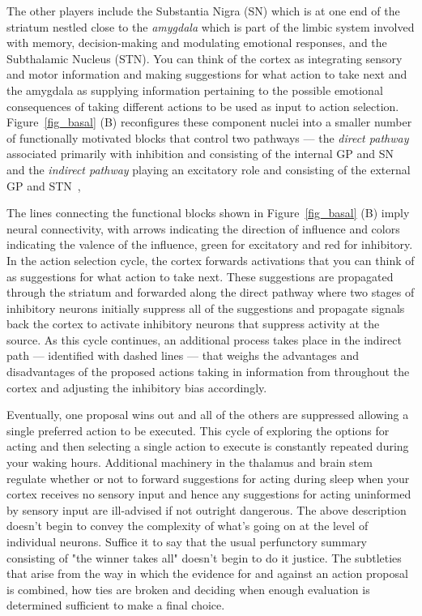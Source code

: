 \documentclass[letterpaper,11pt]{article}
\def\colorred#1{{\color{red}#1}}
\def\urlh#1{{}}
\def\emdash{---}
\begin{document}
The other players include the Substantia Nigra (SN) which is at one end of the striatum nestled close to the {\it{amygdala}} which is part of the limbic system involved with memory, decision-making and modulating emotional responses, and the Subthalamic Nucleus (STN). You can think of the cortex as integrating sensory and motor information and making suggestions for what action to take next and the amygdala as supplying information pertaining to the possible emotional consequences of taking different actions to be used as input to action selection. Figure~{\urlh{#fig_Basal_Ganglia_Anatomy_and_Physiology}{\ref{fig_basal}}} ({\colorred{B}}) reconfigures these component nuclei into a smaller number of functionally motivated blocks that control two pathways \emdash{} the {\it{direct pathway}} associated primarily with inhibition and consisting of the internal GP and SN and the {\it{indirect pathway}} playing an excitatory role and consisting of the external GP and STN~\cite{OReillyetalCCN-12,WangetalNATURE-NEUROSCIENCE-18},

The lines connecting the functional blocks shown in Figure~{\urlh{#fig_Basal_Ganglia_Anatomy_and_Physiology}{\ref{fig_basal}}} ({\colorred{B}}) imply neural connectivity, with arrows indicating the direction of influence and colors indicating the valence of the influence, green for excitatory and red for inhibitory. In the action selection cycle, the cortex forwards activations that you can think of as suggestions for what action to take next. These suggestions are propagated through the striatum and forwarded along the direct pathway where two stages of inhibitory neurons initially suppress all of the suggestions and propagate signals back the cortex to activate inhibitory neurons that suppress activity at the source. As this cycle continues, an additional process takes place in the indirect path \emdash{} identified with dashed lines \emdash{} that weighs the advantages and disadvantages of the proposed actions taking in information from throughout the cortex and adjusting the inhibitory bias accordingly.

Eventually, one proposal wins out and all of the others are suppressed allowing a single preferred action to be executed. This cycle of exploring the options for acting and then selecting a single action to execute is constantly repeated during your waking hours. Additional machinery in the thalamus and brain stem regulate whether or not to forward suggestions for acting during sleep when your cortex receives no sensory input and hence any suggestions for acting uninformed by sensory input are ill-advised if not outright dangerous. The above description doesn't begin to convey the complexity of what's going on at the level of individual neurons. Suffice it to say that the usual perfunctory summary consisting of "the winner takes all" doesn't begin to do it justice. The subtleties that arise from the way in which the evidence for and against an action proposal is combined, how ties are broken and deciding when enough evaluation is determined sufficient to make a final choice. 
\end{document}
